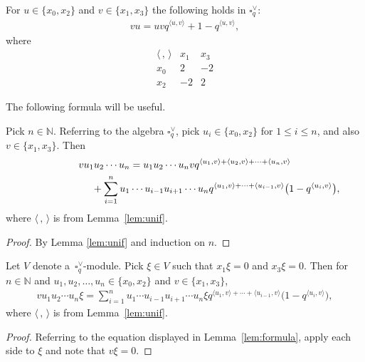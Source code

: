 \begin{Lemma} \label{lem:unif}For $u \in \lbrace x_0, x_2\rbrace$ and $v \in \lbrace x_1, x_3\rbrace$ the following holds in $\square^\vee_q$:
\begin{gather*}
v u = uv q^{\langle u,v\rangle} + 1-q^{\langle u,v\rangle},
\end{gather*}
where
\[
\begin{array}{c|cc}
\langle\,,\,\rangle & x_1 & x_3 \\ \hline
x_0 &2 & -2 \\
x_2 & -2 & 2
 \end{array}
\]
\end{Lemma}

The following formula will be useful.
\begin{Lemma}\label{lem:formula}Pick $n \in \mathbb N$. Referring to the algebra $\square^\vee_q$, pick
$u_i\in\lbrace x_0, x_2\rbrace$ for $1 \leq i \leq n$, and also $v \in \lbrace x_1, x_3\rbrace $. Then
\begin{gather*}
v u_1u_2\cdots u_n = u_1 u_2 \cdots u_n v q^{ \langle u_1,v\rangle+\langle u_2,v\rangle+\cdots+
\langle u_n,v\rangle}\\
\hphantom{v u_1u_2\cdots u_n =}{} + \sum_{i=1}^n u_1\cdots u_{i-1} u_{i+1} \cdots u_n
q^{\langle u_1,v\rangle+\cdots + \langle u_{i-1},v\rangle}\big(1-q^{\langle u_i,v\rangle}\big),
\end{gather*}
where $\langle \,,\,\rangle$ is from Lemma~{\rm \ref{lem:unif}}.
\end{Lemma}
\begin{proof} By Lemma \ref{lem:unif} and induction on $n$.
\end{proof}

\begin{Corollary}\label{cor:modW}Let $V$ denote a~$\square^\vee_q$-module. Pick $\xi \in V$ such that $x_1 \xi = 0$ and $x_3 \xi = 0$. Then for $n \in \mathbb N$ and $u_1, u_2, \ldots, u_n \in\lbrace x_0, x_2\rbrace$ and $v \in \lbrace x_1, x_3\rbrace $,
\begin{gather*}
 v u_1u_2\cdots u_n \xi =\sum_{i=1}^n u_1\cdots u_{i-1} u_{i+1} \cdots u_n \xi
q^{\langle u_1,v\rangle+\cdots + \langle u_{i-1},v\rangle}\big(1-q^{\langle u_i,v\rangle}\big),
\end{gather*}
where $\langle \,,\,\rangle$ is from Lemma~{\rm \ref{lem:unif}}.
\end{Corollary}
\begin{proof} Referring to the equation displayed in Lemma~\ref{lem:formula}, apply each side to $\xi$ and note that $v\xi =0$.
\end{proof}

